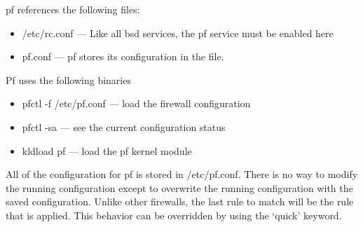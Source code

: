 pf references the following files:
\begin{itemize}
	\item /etc/rc.conf --- Like all bsd services, the pf service must be enabled here
	\item pf.conf  --- pf stores its configuration in the file.
\end{itemize}

Pf uses the following binaries
\begin{itemize}
	\item pfctl -f /etc/pf.conf --- load the firewall configuration
	\item pfctl -sa --- see the current configuration status
	\item kldload pf --- load the pf kernel module
\end{itemize}

All of the configuration for pf is stored in /etc/pf.conf.
There is no way to modify the running configuration except to overwrite the running
configuration with the saved configuration.
Unlike other firewalls, the last rule to match will be the rule that is applied.
This behavior can be overridden by using the `quick' keyword.


